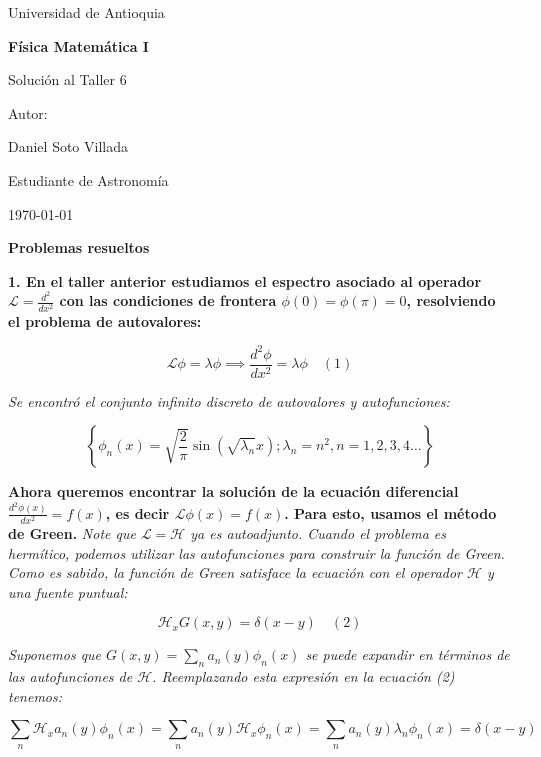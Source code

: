 \documentclass[a4paper]{article}
\begin{document}
\begin{titlepage}
  \centering
  {\Large Universidad de Antioquia\par}
  \vspace{2cm}
  {\huge\bfseries Física Matemática I\par}
  \vspace{0.4cm}
  {\Large Solución al Taller 6 \par}
  \vspace{2.5cm}
  {\large Autor:\par}
  \vspace{0.2cm}
  {\large Daniel Soto Villada\par}
  {\large Estudiante de Astronomía\par}
  \vfill
  {\large \today\par}
\end{titlepage}

\newpage
\tableofcontents
\newpage


\textbf{Problemas resueltos}

\textbf{1. En el taller anterior estudiamos el espectro asociado al operador $\mathscr{L} = \frac{d^2}{dx^2}$ con las condiciones de frontera $\phi(0) = \phi(\pi) = 0$, resolviendo el problema de autovalores:}

$$ \mathscr{L}\phi = \lambda\phi \implies \frac{d^2\phi}{dx^2} = \lambda\phi \quad (1) $$

\textit{Se encontró el conjunto infinito discreto de autovalores y autofunciones:}

$$ \left\{ \phi_n(x) = \sqrt{\frac{2}{\pi}} \sin(\sqrt{\lambda_n} x) ; \lambda_n = n^2, n = 1, 2, 3, 4\dots \right\} $$

\textbf{Ahora queremos encontrar la solución de la ecuación diferencial $\frac{d^2\phi(x)}{dx^2} = f(x)$, es decir $\mathscr{L}\phi(x) = f(x)$. Para esto, usamos el método de Green.} \textit{Note que $\mathscr{L} = \mathscr{H}$ ya es autoadjunto. Cuando el problema es hermítico, podemos utilizar las autofunciones para construir la función de Green. Como es sabido, la función de Green satisface la ecuación con el operador $\mathscr{H}$ y una fuente puntual:}

$$ \mathscr{H}_x G(x, y) = \delta(x - y) \quad (2) $$

\textit{Suponemos que $G(x, y) = \sum_n a_n(y)\phi_n(x)$ se puede expandir en términos de las autofunciones de $\mathscr{H}$. Reemplazando esta expresión en la ecuación (2) tenemos:}

$$ \sum_n \mathscr{H}_x a_n(y)\phi_n(x) = \sum_n a_n(y) \mathscr{H}_x \phi_n(x) = \sum_n a_n(y) \lambda_n \phi_n(x) = \delta(x - y) $$
\end{document}
